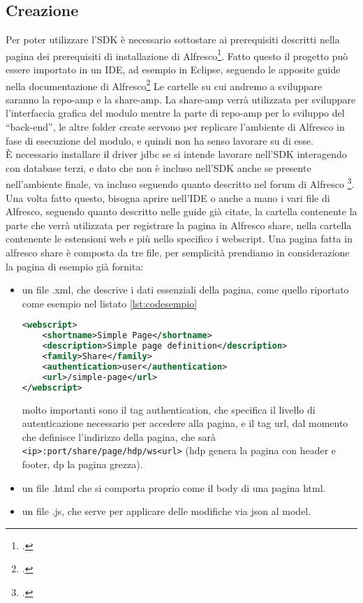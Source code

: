 \subsection{Creazione}
Per poter utilizzare l'SDK è necessario sottostare ai prerequisiti descritti nella pagina dei prerequisiti di installazione di Alfresco\footcite{site:alfresco-prerequisites}.
Fatto questo il progetto può essere importato in un IDE, ad esempio in Eclipse, seguendo le apposite guide nella documentazione di Alfresco\footcite{site:alfresco-rad}
Le cartelle su cui andremo a sviluppare saranno la repo-amp e la share-amp. La share-amp verrà utilizzata per sviluppare l’interfaccia grafica del modulo mentre la parte di repo-amp  per lo sviluppo del “back-end”, le altre folder create servono per replicare l’ambiente di Alfresco in fase di esecuzione del modulo, e quindi non ha senso lavorare su di esse.\\
È necessario installare il driver jdbc se si intende  lavorare nell’SDK interagendo con database terzi, e dato che non è incluso nell'SDK anche se presente nell'ambiente finale, va incluso seguendo quanto descritto nel forum di Alfresco \footcite{site:alfresco-jdbc}. 
Una volta fatto questo, bisogna aprire nell’IDE o anche a mano i vari file di Alfresco, seguendo quanto descritto nelle guide già citate, la cartella contenente la parte che verrà utilizzata per registrare la pagina in Alfresco share, nella cartella contenente le estensioni web e più nello specifico i webscript. %
Una pagina fatta in alfresco share è composta da tre file, per semplicità prendiamo in considerazione la pagina di esempio già fornita:
\begin{itemize}
\item un file .xml, che descrive i dati essenziali della pagina, come quello riportato come esempio nel listato \ref{lst:codesempio}
\begin{lstlisting}[language=XML, caption=codice di una pagina di esempio, label=lst:codesempio]
<webscript>
    <shortname>Simple Page</shortname>
    <description>Simple page definition</description>
    <family>Share</family>
    <authentication>user</authentication>
    <url>/simple-page</url>
</webscript>
\end{lstlisting}
molto importanti sono il tag authentication, che specifica il livello di autenticazione necessario per accedere alla pagina, e il tag url, dal momento che definisce l’indirizzo della pagina, che sarà \texttt{<ip>:port/share/page/hdp/ws<url>} (hdp genera la pagina con header e footer, dp la pagina grezza).
\item un file .html che si comporta proprio come il body di una pagina html.
\item un file .js, che serve per applicare delle modifiche via json al model.
\end{itemize}
